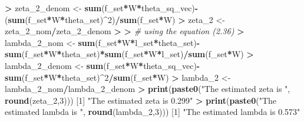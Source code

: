 \documentclass[
]{article}
\newenvironment{Shaded}{\begin{snugshade}}{\end{snugshade}}
\newcommand{\CommentTok}[1]{\textcolor[rgb]{0.56,0.35,0.01}{\textit{#1}}}
\newcommand{\DecValTok}[1]{\textcolor[rgb]{0.00,0.00,0.81}{#1}}
\newcommand{\ErrorTok}[1]{\textcolor[rgb]{0.64,0.00,0.00}{\textbf{#1}}}
\newcommand{\FunctionTok}[1]{\textcolor[rgb]{0.13,0.29,0.53}{\textbf{#1}}}
\newcommand{\NormalTok}[1]{#1}
\newcommand{\OtherTok}[1]{\textcolor[rgb]{0.56,0.35,0.01}{#1}}
\newcommand{\SpecialCharTok}[1]{\textcolor[rgb]{0.81,0.36,0.00}{\textbf{#1}}}
\newcommand{\StringTok}[1]{\textcolor[rgb]{0.31,0.60,0.02}{#1}}
\begin{document}
\begin{Shaded}
\begin{Highlighting}[]
\SpecialCharTok{\textgreater{}}\NormalTok{ zeta\_2\_denom }\OtherTok{\textless{}{-}} \FunctionTok{sum}\NormalTok{(f\_set}\SpecialCharTok{*}\NormalTok{W}\SpecialCharTok{*}\NormalTok{theta\_sq\_vec)}\SpecialCharTok{{-}}\NormalTok{ (}\FunctionTok{sum}\NormalTok{(f\_set}\SpecialCharTok{*}\NormalTok{W}\SpecialCharTok{*}\NormalTok{theta\_set)}\SpecialCharTok{\^{}}\DecValTok{2}\NormalTok{)}\SpecialCharTok{/}\FunctionTok{sum}\NormalTok{(f\_set}\SpecialCharTok{*}\NormalTok{W)}
\SpecialCharTok{\textgreater{}}\NormalTok{ zeta\_2 }\OtherTok{\textless{}{-}}\NormalTok{ zeta\_2\_nom}\SpecialCharTok{/}\NormalTok{zeta\_2\_denom}
\SpecialCharTok{\textgreater{}} 
\ErrorTok{\textgreater{}} \CommentTok{\# using the equation (2.36)}
\ErrorTok{\textgreater{}}\NormalTok{ lambda\_2\_nom }\OtherTok{\textless{}{-}} \FunctionTok{sum}\NormalTok{(f\_set}\SpecialCharTok{*}\NormalTok{W}\SpecialCharTok{*}\NormalTok{l\_set}\SpecialCharTok{*}\NormalTok{theta\_set)}\SpecialCharTok{{-}}\FunctionTok{sum}\NormalTok{(f\_set}\SpecialCharTok{*}\NormalTok{W}\SpecialCharTok{*}\NormalTok{theta\_set)}\SpecialCharTok{*}\FunctionTok{sum}\NormalTok{(f\_set}\SpecialCharTok{*}\NormalTok{W}\SpecialCharTok{*}\NormalTok{l\_set)}\SpecialCharTok{/}\FunctionTok{sum}\NormalTok{(f\_set}\SpecialCharTok{*}\NormalTok{W)}
\SpecialCharTok{\textgreater{}}\NormalTok{ lambda\_2\_denom }\OtherTok{\textless{}{-}} \FunctionTok{sum}\NormalTok{(f\_set}\SpecialCharTok{*}\NormalTok{W}\SpecialCharTok{*}\NormalTok{theta\_sq\_vec)}\SpecialCharTok{{-}}\FunctionTok{sum}\NormalTok{(f\_set}\SpecialCharTok{*}\NormalTok{W}\SpecialCharTok{*}\NormalTok{theta\_set)}\SpecialCharTok{\^{}}\DecValTok{2}\SpecialCharTok{/}\FunctionTok{sum}\NormalTok{(f\_set}\SpecialCharTok{*}\NormalTok{W)}
\SpecialCharTok{\textgreater{}}\NormalTok{ lambda\_2 }\OtherTok{\textless{}{-}}\NormalTok{ lambda\_2\_nom}\SpecialCharTok{/}\NormalTok{lambda\_2\_denom}
\SpecialCharTok{\textgreater{}} \FunctionTok{print}\NormalTok{(}\FunctionTok{paste0}\NormalTok{(}\StringTok{"The estimated zeta is "}\NormalTok{, }\FunctionTok{round}\NormalTok{(zeta\_2,}\DecValTok{3}\NormalTok{)))}
\NormalTok{[}\DecValTok{1}\NormalTok{] }\StringTok{"The estimated zeta is 0.299"}
\SpecialCharTok{\textgreater{}} \FunctionTok{print}\NormalTok{(}\FunctionTok{paste0}\NormalTok{(}\StringTok{"The estimated lambda is "}\NormalTok{, }\FunctionTok{round}\NormalTok{(lambda\_2,}\DecValTok{3}\NormalTok{)))}
\NormalTok{[}\DecValTok{1}\NormalTok{] }\StringTok{"The estimated lambda is 0.573"}
\end{Highlighting}
\end{Shaded}
\end{document}
